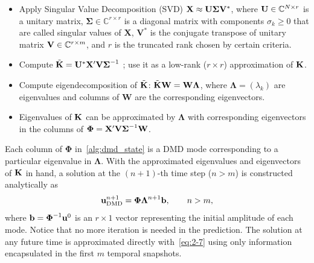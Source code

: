 \documentclass[10pt]{article}
\numberwithin{equation}{section}
\theoremstyle{plain}
\theoremstyle{remark}
\theoremstyle{remark}
\begin{document}
\begin{algorithm}
\caption{DMD algorithm on state space~\cite{kutzbook}}
\label{alg:dmd_state}
\begin{itemize}
\item[1.] Apply Singular Value Decomposition (SVD) $\bold X \approx \bold U\boldsymbol\Sigma \bold V^*$, where $\bold U \in \mathbb C^{N\times r}$ is a unitary matrix, $\boldsymbol \Sigma \in \mathbb C^{r\times r}$ is a diagonal matrix with components $\sigma_k \ge 0$ that are called singular values of $\mathbf X$, $\mathbf V^*$ is the conjugate transpose of unitary matrix $\bold V\in \mathbb C^{r\times m}$, and $r$ is the truncated rank chosen by certain criteria.
\item [2.] Compute $\tilde{\bold K}=\bold U^*\bold X'\bold V\boldsymbol\Sigma^{-1}$ ; use it as a low-rank ($r\times r$) approximation of $\bold K$.
\item [3.] Compute eigendecomposition of $\tilde{\bold K}$: $\tilde{\bold K} \bold W = \bold W\boldsymbol\Lambda$, where $\boldsymbol\Lambda = (\lambda_k)$ are eigenvalues and columns of $\mathbf W$ are the corresponding eigenvectors.
\item [4.] Eigenvalues of $\bold K$ can be approximated by $\boldsymbol\Lambda$ with corresponding eigenvectors in the columns of $\boldsymbol\Phi  = \bold X'\bold V\boldsymbol\Sigma^{-1}\bold W$.
\end{itemize}
\end{algorithm}

Each column of $\boldsymbol\Phi$ in~\cref{alg:dmd_state} is a DMD mode corresponding to a particular eigenvalue in $\boldsymbol\Lambda$. With the approximated eigenvalues and eigenvectors of $\bold K$ in hand, a solution at the $(n+1)$-th time step ($n>m$) is constructed analytically as
\begin{equation}\label{eq:2-7}
\bold u_\text{DMD}^{n+1} =\boldsymbol\Phi\boldsymbol\Lambda^{n+1}\bold b,  \qquad n>m,
\end{equation}
where $\bold b =\boldsymbol\Phi^{-1}\bold u^{0}$ is an $r\times1$ vector representing the initial amplitude of each mode. Notice that no more iteration is needed in the prediction. The solution at any future time is approximated directly with~\cref{eq:2-7} using only information encapsulated in the first $m$ temporal snapshots.
\end{document}
